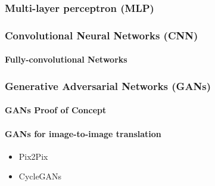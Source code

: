 \documentclass[../main.tex]{subfiles}
\begin{document}
\lipsum[3]

\subsubsection{Multi-layer perceptron (MLP)}

\lipsum[4]

\subsubsection{Convolutional Neural Networks (CNN)}

\lipsum[5-6]

\paragraph{Fully-convolutional Networks}

\subsubsection{Generative Adversarial Networks (GANs)}

\lipsum[7-8]

\paragraph{GANs Proof of Concept}

\lipsum[9]

\paragraph{GANs for image-to-image translation}

\begin{itemize}
  \item Pix2Pix
  \item CycleGANs
\end{itemize}
\end{document}
